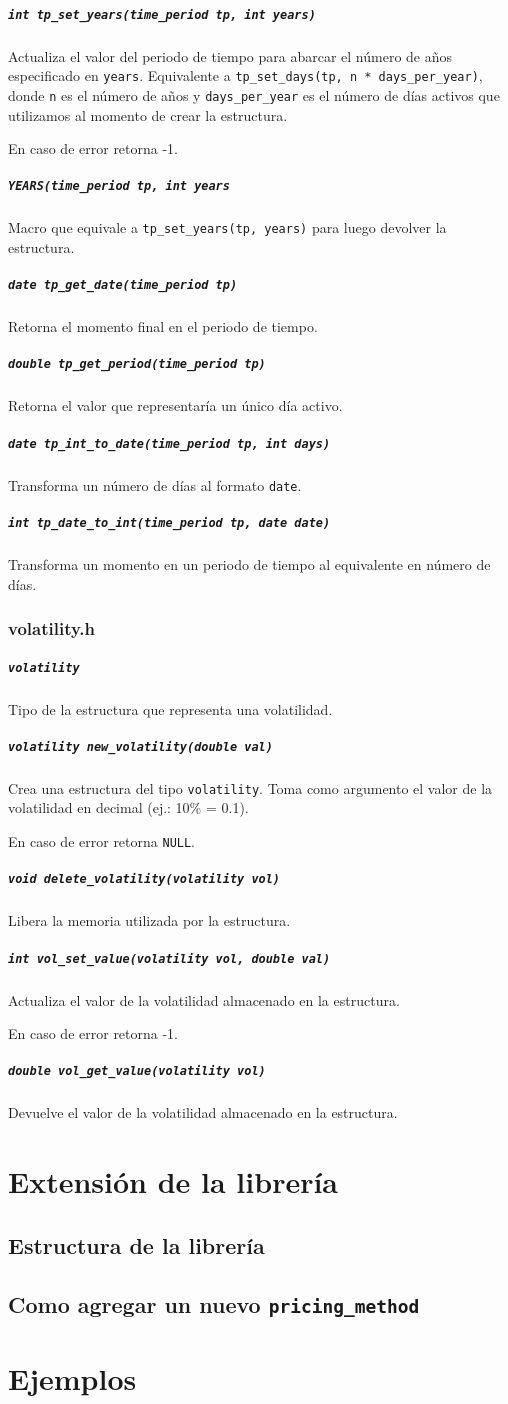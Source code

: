 \documentclass[12pt,a4paper,final]{article}
\begin{document}
			\subparagraph{\texttt{int tp\_set\_years(time\_period tp, int years)}}
				Actualiza el valor del periodo de tiempo para abarcar el número de años
				especificado en \texttt{years}. Equivalente a 
				\texttt{tp\_set\_days(tp, n * days\_per\_year)}, donde \texttt{n}
				es el número de años y \texttt{days\_per\_year} es el número de días
				activos que utilizamos al momento de crear la estructura.
				
				En caso de error retorna -1.
				
			\subparagraph{\texttt{YEARS(time\_period tp, int years}}
				Macro que equivale a \texttt{tp\_set\_years(tp, years)} para luego devolver
				la estructura.
				
			\subparagraph{\texttt{date tp\_get\_date(time\_period tp)}}
				Retorna el momento final en el periodo de tiempo.
				
			\subparagraph{\texttt{double tp\_get\_period(time\_period tp)}}
				Retorna el valor que representaría un único día activo.
			
			\subparagraph{\texttt{date tp\_int\_to\_date(time\_period tp, int days)}}
				Transforma un número de días al formato \texttt{date}.
				
			\subparagraph{\texttt{int tp\_date\_to\_int(time\_period tp, date date)}}
				Transforma un momento en un periodo de tiempo al equivalente en número de días.
			
		\subsubsection{volatility.h}

			\subparagraph{\texttt{volatility}}
				Tipo de la estructura que representa una volatilidad.
				
			\subparagraph{\texttt{volatility new\_volatility(double val)}}
				Crea una estructura del tipo \texttt{volatility}. Toma como argumento
				el valor de la volatilidad en decimal (ej.: 10\% = 0.1).
				
				En caso de error retorna \texttt{NULL}.
				
			\subparagraph{\texttt{void delete\_volatility(volatility vol)}}
				Libera la memoria utilizada por la estructura.
				
			\subparagraph{\texttt{int vol\_set\_value(volatility vol, double val)}}
				Actualiza el valor de la volatilidad almacenado en la estructura.
				
				En caso de error retorna -1.
				
			\subparagraph{\texttt{double vol\_get\_value(volatility vol)}}
				Devuelve el valor de la volatilidad almacenado en la estructura.			
			
\section{Extensión de la librería}
	\subsection{Estructura de la librería}
	\subsection{Como agregar un nuevo \texttt{pricing\_method}}

\section{Ejemplos}
	
\printindex
\end{document}
